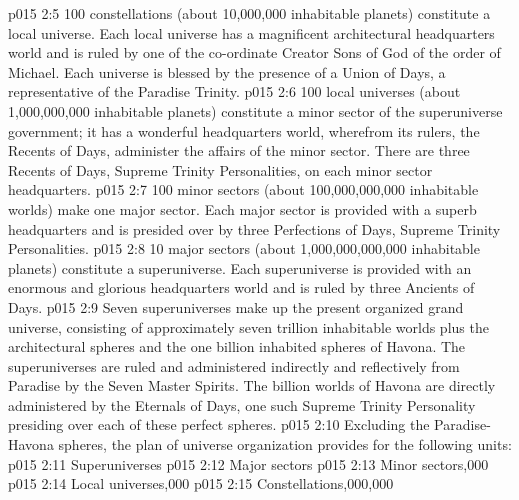 \vs p015 2:5 \bibnobreakspace {} 100 constellations (about 10,000,000 inhabitable planets) constitute a local universe. Each local universe has a magnificent architectural headquarters world and is ruled by one of the co\hyp{}ordinate Creator Sons of God of the order of Michael. Each universe is blessed by the presence of a Union of Days, a representative of the Paradise Trinity.
\vs p015 2:6 \bibnobreakspace {} 100 local universes (about 1,000,000,000 inhabitable planets) constitute a minor sector of the superuniverse government; it has a wonderful headquarters world, wherefrom its rulers, the Recents of Days, administer the affairs of the minor sector. There are three Recents of Days, Supreme Trinity Personalities, on each minor sector headquarters.
\vs p015 2:7 \bibnobreakspace {} 100 minor sectors (about 100,000,000,000 inhabitable worlds) make one major sector. Each major sector is provided with a superb headquarters and is presided over by three Perfections of Days, Supreme Trinity Personalities.
\vs p015 2:8 \bibnobreakspace {} 10 major sectors (about 1,000,000,000,000 inhabitable planets) constitute a superuniverse. Each superuniverse is provided with an enormous and glorious headquarters world and is ruled by three Ancients of Days.
\vs p015 2:9 \bibnobreakspace {} Seven superuniverses make up the present organized grand universe, consisting of approximately seven trillion inhabitable worlds plus the architectural spheres and the one billion inhabited spheres of Havona. The superuniverses are ruled and administered indirectly and reflectively from Paradise by the Seven Master Spirits. The billion worlds of Havona are directly administered by the Eternals of Days, one such Supreme Trinity Personality presiding over each of these perfect spheres.
\vs p015 2:10 \pc Excluding the Paradise\hyp{}Havona spheres, the plan of universe organization provides for the following units:
\vs p015 2:11 Superuniverses
\vs p015 2:12 Major sectors
\vs p015 2:13 Minor sectors,000
\vs p015 2:14 Local universes,000
\vs p015 2:15 Constellations,000,000
